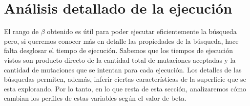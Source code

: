 \section{Análisis detallado de la ejecución}
% 
% 



El rango de $\beta$ obtenido es útil para poder ejecutar eficientemente la búsqueda pero, si queremos conocer más en detalle las propiedades de la búsqueda,
hace falta desglosar el tiempo de ejecución.
Sabemos que los tiempos de ejecución vistos son producto directo de la cantidad total de mutaciones aceptadas y la cantidad de mutaciones que se intentan para cada ejecución.
Los detalles de las búsquedas permiten, además, inferir ciertas características de la superficie que se esta explorando.
Por lo tanto, en lo que resta de esta sección, analizaremos cómo cambian los perfiles de estas variables según el valor de beta.
 
